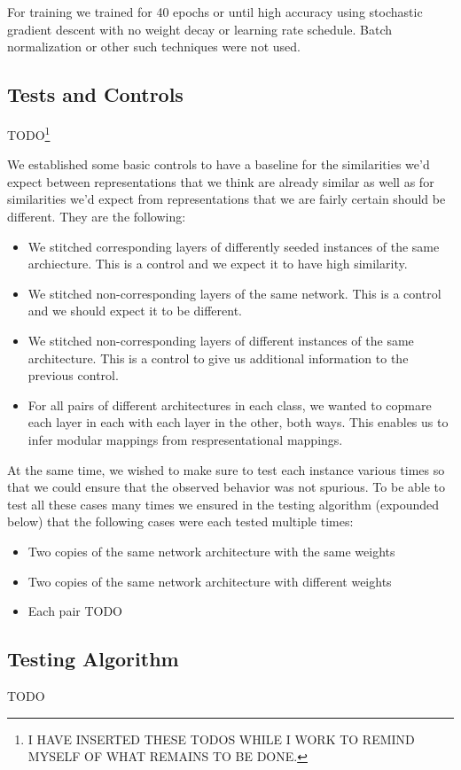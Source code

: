 \documentclass{article} %
\begin{document}
For training we trained for 40 epochs or until high accuracy using stochastic gradient descent with no
weight decay or learning rate schedule. Batch normalization or other such techniques were not used.

\subsection{Tests and Controls}
TODO\footnote{I HAVE INSERTED THESE TODOS WHILE I WORK TO REMIND MYSELF OF WHAT REMAINS TO BE DONE.}

We established some basic controls to
have a baseline for the similarities we'd expect between representations that we think are already similar
as well as for similarities we'd expect from representations that we are fairly certain should be
different. They are the following:
\begin{itemize}
   \item We stitched corresponding layers of differently seeded instances of the same archiecture. This is a control and we expect it to have high similarity.
   \item We stitched non-corresponding layers of the same network. This is a control and we should expect it to be different.
   \item We stitched non-corresponding layers of different instances of the same architecture. This is a control to give us additional information to the previous control.
   \item For all pairs of different architectures in each class, we wanted to copmare each layer in each with each layer in the other, both ways. This enables us to infer modular mappings from respresentational mappings.
\end{itemize}

At the same time, we wished to make sure to test each instance various times so that we could ensure that the observed behavior was not spurious.
To be able to test all these cases many times we ensured in the testing algorithm (expounded below) that the following cases were
each tested multiple times:
\begin{itemize}
   \item Two copies of the same network architecture with the same weights
   \item Two copies of the same network architecture with different weights
   \item Each pair TODO
\end{itemize}

\subsection{Testing Algorithm}
TODO
\end{document}
